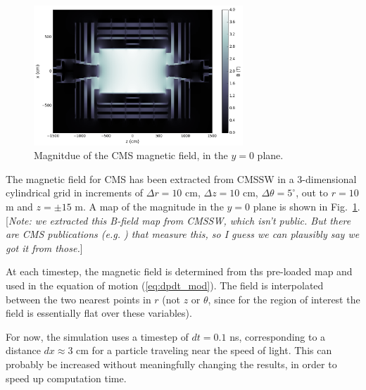 \documentclass[11pt]{article}
\begin{document}
\begin{figure}
\centering
\includegraphics[width=0.7\textwidth]{plots/cms_bfield_coarse.png}
\caption{Magnitdue of the CMS magnetic field, in the $y=0$ plane.}
\label{fig:bfield}
\end{figure}

The magnetic field for CMS has been extracted from CMSSW
in a 3-dimensional cylindrical grid in increments of $\Delta r=10$ cm, $\Delta z=10$ cm, $\Delta\theta=5^\circ$, out to
$r=10$ m and $z=\pm15$ m. A map of the magnitude in the $y=0$ plane is shown in Fig.~\ref{fig:bfield}.
[\emph{Note: we extracted this B-field map from CMSSW, which isn't public. But there are CMS publications (e.g. \cite{CMS_bfield}) that measure
this, so I guess we can plausibly say we got it from those.}]

At each timestep, the magnetic field is determined from ths pre-loaded map and used in the equation of motion (\ref{eq:dpdt_mod}).
The field is interpolated between the two nearest points in $r$ (not $z$ or $\theta$, since for the region of interest the field
is essentially flat over these variables).

For now, the simulation uses a timestep of $dt=0.1$ ns, corresponding to a distance $dx\approx3$ cm for a particle traveling near
the speed of light. This can probably be increased without meaningfully changing the results, in order to speed up computation time.
\end{document}
